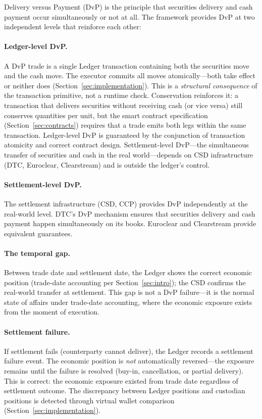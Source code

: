 \documentclass[11pt,a4paper]{article}
\begin{document}
Delivery versus Payment (DvP) is the principle that securities delivery and cash payment occur simultaneously or not at all. The framework provides DvP at two independent levels that reinforce each other:

\paragraph{Ledger-level DvP.} A DvP trade is a single Ledger transaction containing both the securities move and the cash move. The executor commits all moves atomically---both take effect or neither does (Section~\ref{sec:implementation}). This is a \emph{structural consequence} of the transaction primitive, not a runtime check. Conservation reinforces it: a transaction that delivers securities without receiving cash (or vice versa) still conserves quantities per unit, but the smart contract specification (Section~\ref{sec:contracts}) requires that a trade emits both legs within the same transaction. Ledger-level DvP is guaranteed by the conjunction of transaction atomicity and correct contract design. Settlement-level DvP---the simultaneous transfer of securities and cash in the real world---depends on CSD infrastructure (DTC, Euroclear, Clearstream) and is outside the ledger's control.

\paragraph{Settlement-level DvP.} The settlement infrastructure (CSD, CCP) provides DvP independently at the real-world level. DTC's DvP mechanism ensures that securities delivery and cash payment happen simultaneously on its books. Euroclear and Clearstream provide equivalent guarantees.

\paragraph{The temporal gap.} Between trade date and settlement date, the Ledger shows the correct economic position (trade-date accounting per Section~\ref{sec:intro}); the CSD confirms the real-world transfer at settlement. This gap is not a DvP failure---it is the normal state of affairs under trade-date accounting, where the economic exposure exists from the moment of execution.

\paragraph{Settlement failure.} If settlement fails (counterparty cannot deliver), the Ledger records a settlement failure event. The economic position is \emph{not} automatically reversed---the exposure remains until the failure is resolved (buy-in, cancellation, or partial delivery). This is correct: the economic exposure existed from trade date regardless of settlement outcome. The discrepancy between Ledger positions and custodian positions is detected through virtual wallet comparison (Section~\ref{sec:implementation}).
\end{document}
